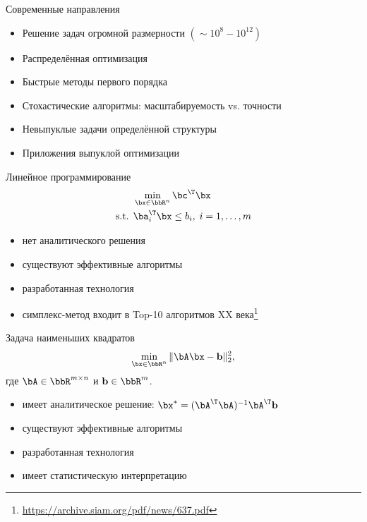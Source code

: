 \documentclass[12pt]{beamer}
\begin{document}
\begin{frame}{Современные направления}
\begin{itemize}[<+->]
\item Решение задач огромной размерности $(\sim 10^8-10^{12})$
\item Распределённая оптимизация
\item Быстрые методы первого порядка
\item Стохастические алгоритмы: масштабируемость vs. точности
\item Невыпуклые задачи определённой структуры
\item Приложения выпуклой оптимизации
\end{itemize}
\end{frame}

\begin{frame}{Линейное программирование}
\begin{equation*}
\begin{split}
&\min\limits_{\bx \in \bbR^n} \bc^{\T}\bx\\
\text{s.t. } & \ba^{\T}_i \bx \leq b_i, \; i = 1,\ldots, m
\end{split}
\label{eq::lin_prog}
\end{equation*}
\begin{itemize}
\item нет аналитического решения
\item существуют эффективные алгоритмы
\item разработанная технология
\item симплекс-метод входит в Top-10 алгоритмов XX века\footnote{\url{https://archive.siam.org/pdf/news/637.pdf}}
\end{itemize}
\end{frame}

\begin{frame}{Задача наименьших квадратов}
\begin{equation*}
\min\limits_{\bx \in \bbR^n} \|\bA\bx - \mathbf{b} \|^2_2,
\label{eq::least_sq}
\end{equation*}
где $\bA \in \bbR^{m \times n}$ и $\mathbf{b} \in \bbR^m$.
\begin{itemize}
\item имеет аналитическое решение: $\bx^* = (\bA^{\T}\bA)^{-1}\bA^{\T}\mathbf{b}$
\item существуют эффективные алгоритмы
\item разработанная технология
\item имеет статистическую интерпретацию
\end{itemize}
\end{frame}
\end{document}
